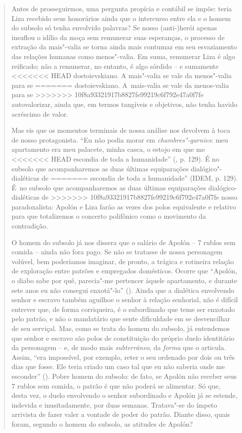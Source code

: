 {\begin{quote}
Antes de prosseguirmos, uma pergunta propícia e contábil se impõe: teria
Liza recebido seus honorários ainda que o intercurso entre ela e o homem
do subsolo só tenha envolvido palavras? Se nosso (anti-)herói apenas
insuflou o idílio da moça sem remunerar suas esperanças, o processo de
extração da mais"-valia se torna ainda mais contumaz em seu esvaziamento
das relações humanas como menos"-valia. Em suma, remunerar Liza é algo
reificado; não a remunerar, no entanto, é algo sórdido -- e sumamente
<<<<<<< HEAD
dostoievskiano. A mais"-valia se vale da menos"-valia para se
=======
dostoievskiano. A~mais-valia se vale da menos-valia para se
>>>>>>> 10f8a93321917b8827fe99219c6f792e47a0f7fe
autovalorizar, ainda que, em termos tangíveis e objetivos, não tenha
havido acréscimo de valor.

Mas eis que os momentos terminais de nossa análise nos devolvem à toca
de nosso protagonista. ``Eu não podia morar em \emph{chambres"-garnies}:
meu apartamento era meu palacete, minha casca, o estojo em que me
<<<<<<< HEAD
escondia de toda a humanidade'' (, p. 129). É no subsolo que
acompanharemos as duas últimas equiparações dialógico"-dialéticas de
=======
escondia de toda a humanidade'' (IDEM, p. 129). É~no subsolo que
acompanharemos as duas últimas equiparações dialógico-dialéticas de
>>>>>>> 10f8a93321917b8827fe99219c6f792e47a0f7fe
nosso paradoxalista: Apolón e Liza farão as vezes dos polos equivalente
e relativo para que totalizemos o concerto polifônico como o movimento
da contradição.

O homem do subsolo já nos dissera que o salário de Apolón -- 7 rublos
sem comida -- ainda não fora pago. Se não se tratasse de nossa
personagem volúvel, bem poderíamos imaginar, de pronto, a trágica e
rotineira relação de exploração entre patrões e empregados domésticos.
Ocorre que ``Apolón, o diabo sabe por quê, parecia"-me pertencer àquele
apartamento, e durante sete anos eu não consegui enxotá"-lo'' ().
Ainda que a dialética envolvendo senhor e escravo também aguilhoe o
senhor à relação senhorial, não é difícil entrever que, de forma
corriqueira, é o subordinado que teme ser enxotado pelo patrão, e não o
mandatário que sente dificuldade em se desvencilhar de seu serviçal.
Mas, como se trata do homem do subsolo, já entendemos que senhor e
escravo são polos de constituição do próprio duelo identitário da
personagem -- e, de modo mais \emph{subterrâneo}, da \emph{forma} que o
articula. Assim, ``era impossível, por exemplo, reter o seu ordenado por
dois ou três dias que fosse. Ele teria criado um caso tal que eu não
saberia onde me esconder'' (). Pobre homem do subsolo: de fato, se
Apolón não receber seus 7 rublos sem comida, o patrão é que não poderá
se alimentar. Só que, desta vez, o duelo envolvendo o senhor subordinado
e Apolón já se estende, indevida e inusitadamente, por duas semanas.
Tratava"-se do ímpeto arrivista de fazer valer a vontade de poder do
patrão. Diante disso, quais foram, segundo o homem do subsolo, as
atitudes de Apolón?


\end{quote}}
